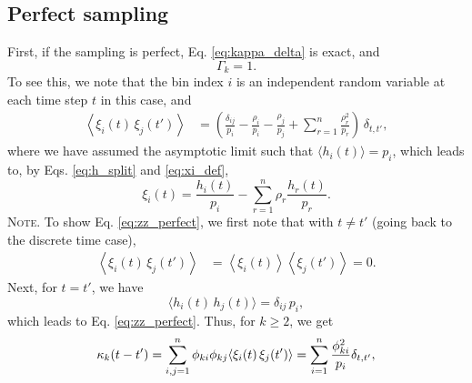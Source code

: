 \documentclass[reprint, floatfix]{revtex4-1}
\newcommand{\note}[1]{{\color{DarkGreen}\footnotesize \textsc{Note.} #1}}
\begin{document}
\subsection{\label{sec:Gamma_perfect}
Perfect sampling}


First, if the sampling is perfect,
Eq. \eqref{eq:kappa_delta} is exact, and
%
\begin{equation}
  \Gamma_k = 1.
\label{eq:Gamma_perfect}
\end{equation}
%
To see this, we note that
the bin index $i$ is an independent random variable
at each time step $t$ in this case, and
%
\begin{align}
  \left\langle
    \xi_i(t) \, \xi_j(t')
  \right\rangle
  &=
  \left(
    \frac{ \delta_{ij} } { p_i }
    -
    \frac{ \rho_i } { p_i }
    -
    \frac{ \rho_j } { p_j }
    +
    \sum_{r = 1}^n
    \frac{ \rho_r^2 } { p_r }
  \right) \,
  \delta_{t, t'}
  ,
\label{eq:zz_perfect}
\end{align}
%
where
we have assumed the asymptotic limit
such that $\langle h_i(t) \rangle = p_i$,
which leads to,
by Eqs. \eqref{eq:h_split} and \eqref{eq:xi_def},
$$
  \xi_i(t)
  =
  \frac{ h_i(t) } { p_i }
  -
  \sum_{ r = 1 }^n
    \rho_r \frac{ h_r(t) } { p_r }
  .
$$
%
\note{To show Eq. \eqref{eq:zz_perfect}, we first note that
  with $t \ne t'$ (going back to the discrete time case),
  $$
  \begin{aligned}
  \left\langle
    \xi_i(t) \, \xi_j(t')
  \right\rangle
  &=
  \left\langle
    \xi_i(t)
  \right\rangle
  \left\langle
    \xi_j(t')
  \right\rangle
  =
  0.
  \end{aligned}
  $$
  Next, for $t = t'$, we have
  $$
  \langle
    h_i(t) \, h_j(t)
  \rangle
  = \delta_{ij} \, p_i
  ,
  $$
  which leads to Eq. \eqref{eq:zz_perfect}.
}
%
Thus,
for $k \ge 2$, we get
%
\begin{equation}
  \kappa_k(t - t')
  =
  \sum_{i,j = 1}^n
  \phi_{ki} \phi_{kj}
  \langle \xi_i(t) \, \xi_j(t') \rangle
  = \sum_{i = 1}^n \frac{ \phi_{ki}^2 } { p_i }
  \delta_{t, t'},
\notag
\end{equation}
\end{document}
